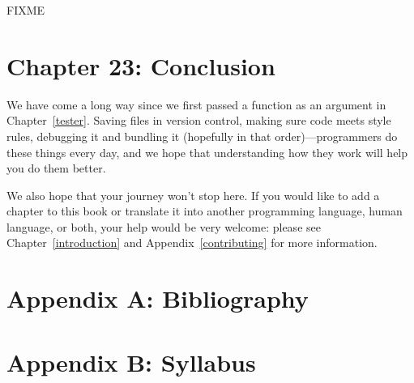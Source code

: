\documentclass{scrbook}
\newcommand{\appref}[1]{Appendix~\ref{#1}}
\newcommand{\chapref}[1]{Chapter~\ref{#1}}
\begin{document}
FIXME

\chapter{Chapter 23: Conclusion}\label{conclusion}


We have come a long way since we first passed a function as an argument in \chapref{tester}.
Saving files in version control,
making sure code meets style rules,
debugging it and bundling it (hopefully in that order)—programmers do these things every day,
and we hope that understanding how they work will help you do them better.


We also hope that your journey won't stop here.
If you would like to add a chapter to this book
or translate it into another programming language,
human language,
or both,
your help would be very welcome:
please see \chapref{introduction} and \appref{contributing} for more information.


\appendix
\chapter{Appendix A: Bibliography}\label{bibliography}

\printbibliography[heading=none]

\chapter{Appendix B: Syllabus}\label{syllabus}
\end{document}
